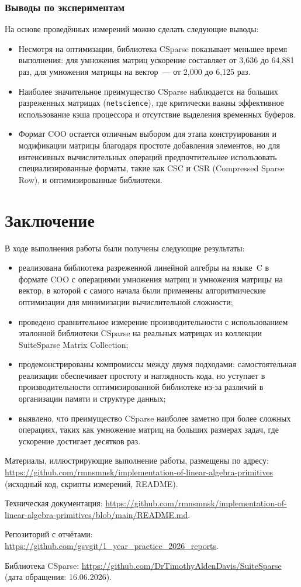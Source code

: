 \documentclass[a4paper]{article}
\begin{document}
\subsubsection{Выводы по экспериментам}
На основе проведённых измерений можно сделать следующие выводы:
\begin{itemize}
    \item Несмотря на оптимизации, библиотека CSparse показывает меньшее время выполнения: для умножения матриц ускорение составляет от 3,636 до 64,881 раз, для умножения матрицы на вектор~--- от 2,000 до 6,125 раз.
    \item Наиболее значительное преимущество CSparse наблюдается на больших разреженных матрицах (\texttt{netscience}), где критически важны эффективное использование кэша процессора и отсутствие выделения временных буферов.
    \item Формат COO остается отличным выбором для этапа конструирования и модификации матрицы благодаря простоте добавления элементов, но для интенсивных вычислительных операций предпочтительнее использовать специализированные форматы, такие как CSC и CSR (Compressed Sparse Row), и оптимизированные библиотеки.
\end{itemize}

\section{Заключение}
В ходе выполнения работы были получены следующие результаты:
\begin{itemize}
    \item реализована библиотека разреженной линейной алгебры на языке~C в формате COO с операциями умножения матриц и умножения матрицы на вектор, в которой с самого начала были применены алгоритмические оптимизации для минимизации вычислительной сложности;
    \item проведено сравнительное измерение производительности с использованием эталонной библиотеки CSparse на реальных матрицах из коллекции SuiteSparse Matrix Collection;
    \item продемонстрированы компромиссы между двумя подходами: самостоятельная реализация обеспечивает простоту и наглядность кода, но уступает в производительности оптимизированной библиотеке из-за различий в организации памяти и структуре данных;
    \item выявлено, что преимущество CSparse наиболее заметно при более сложных операциях, таких как умножение матриц на больших размерах задач, где ускорение достигает десятков раз.
\end{itemize}

Материалы, иллюстрирующие выполнение работы, размещены по адресу:\\
\url{https://github.com/rmnsmnsk/implementation-of-linear-algebra-primitives} (исходный код, скрипты измерений, README).

Техническая документация: \url{https://github.com/rmnsmnsk/implementation-of-linear-algebra-primitives/blob/main/README.md}.

Репозиторий с отчётами: \url{https://github.com/gsvgit/1_year_practice_2026_reports}.

Библиотека CSparse: \url{https://github.com/DrTimothyAldenDavis/SuiteSparse} (дата обращения: 16.06.2026).
\end{document}
